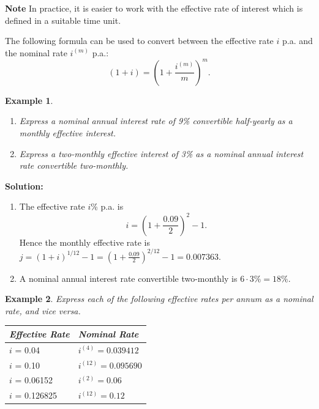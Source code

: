 \documentclass[
]{book}
\theoremstyle{definition}
\theoremstyle{definition}
\newtheorem{example}{Example}[chapter]
\theoremstyle{definition}
\theoremstyle{definition}
\theoremstyle{remark}
\begin{document}
\textbf{Note} In practice, it is easier to work with the effective rate of
interest which is defined in a suitable time unit.

The following formula can be used to convert between the effective rate
\(i\) p.a. and the nominal rate \(i^{(m)}\) p.a.:
\[( 1 + i) = \left( 1 + \frac{i^{(m)}}{m}\right)^m.\]

\begin{example}
\leavevmode

\begin{enumerate}
\def\labelenumi{\arabic{enumi}.}
\item
  \emph{Express a nominal annual interest rate of 9\% convertible
  half-yearly as a monthly effective interest.}
\item
  \emph{Express a two-monthly effective interest of 3\% as a nominal annual
  interest rate convertible two-monthly.}
\end{enumerate}

\end{example}

\textbf{Solution:}

\begin{enumerate}
\def\labelenumi{\arabic{enumi}.}
\item
  The effective rate \(i\)\% p.a. is \[i = ( 1 + \frac{0.09}{2})^2 - 1.\]
  Hence the monthly effective rate is
  \(j = (1 + i)^{1/12} - 1 = ( 1 + \frac{0.09}{2})^{2/12} - 1 = 0.007363\).
\item
  A nominal annual interest rate convertible two-monthly is
  \(6 \cdot 3\% = 18\%\).
\end{enumerate}

\begin{example}

\emph{Express each of the following effective rates per annum as a nominal
rate, and vice versa.}

\begin{longtable}[]{@{}ll@{}}
\toprule\noalign{}
\textbf{\emph{Effective Rate}} & \textbf{\emph{Nominal Rate}} \\
\midrule\noalign{}
\endhead
\bottomrule\noalign{}
\endlastfoot
\(i\) = 0.04 & \(i^{(4)} = 0.039412\) \\
\(i\) = 0.10 & \(i^{(12)} = 0.095690\) \\
\(i\) = 0.06152 & \(i^{(2)} = 0.06\) \\
\(i\) = 0.126825 & \(i^{(12)} = 0.12\) \\
\end{longtable}

\end{example}
\end{document}
